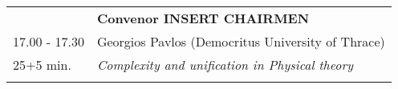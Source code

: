 \begin{longtable}{p{3cm}p{13cm}}
&\hfill {\bf Convenor INSERT CHAIRMEN }\\ 
17.00 - 17.30 & Georgios Pavlos (Democritus University of Thrace)\\ 
25+5 min. & {\it Complexity and unification in Physical theory}\\ 
 & \\ 
\end{longtable}

